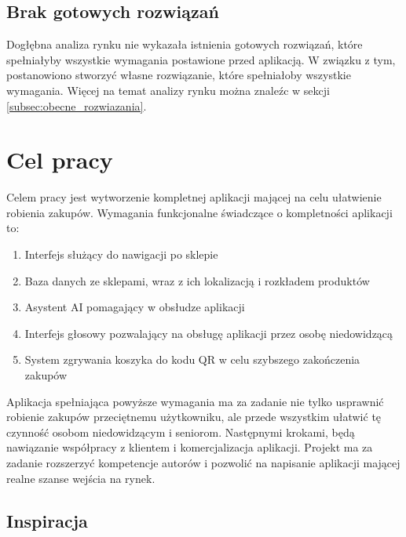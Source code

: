 \subsection{Brak gotowych rozwiązań}

Dogłębna analiza rynku nie wykazała istnienia gotowych rozwiązań, które spełniałyby wszystkie wymagania postawione przed aplikacją. W związku z tym, postanowiono stworzyć własne rozwiązanie, które spełniałoby wszystkie wymagania. Więcej na temat analizy rynku można znaleźc w sekcji \ref{subsec:obecne_rozwiazania}.


\section{Cel pracy}

Celem pracy jest wytworzenie kompletnej aplikacji mającej na celu ułatwienie robienia zakupów. Wymagania funkcjonalne świadczące o kompletności aplikacji to:
\begin{enumerate}
    \item Interfejs służący do nawigacji po sklepie
    \item Baza danych ze sklepami, wraz z ich lokalizacją i rozkładem produktów
    \item Asystent AI pomagający w obsłudze aplikacji
    \item Interfejs głosowy pozwalający na obsługę aplikacji przez osobę niedowidzącą
    \item System zgrywania koszyka do kodu QR w celu szybszego zakończenia zakupów
\end{enumerate}
Aplikacja spełniająca powyższe wymagania ma za zadanie nie tylko usprawnić robienie zakupów przeciętnemu użytkowniku, ale przede wszystkim ułatwić tę czynność osobom niedowidzącym i seniorom. Następnymi krokami, będą nawiązanie współpracy z klientem i komercjalizacja aplikacji. Projekt ma za zadanie rozszerzyć kompetencje autorów i pozwolić na napisanie aplikacji mającej realne szanse wejścia na rynek. 



\subsection{Inspiracja}

